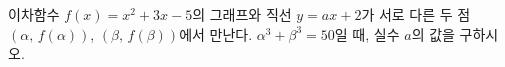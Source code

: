 이차함수 $f(x)=x^2+3x-5$의 그래프와 직선 $y=ax+2$가 서로 다른 두 점 $(\alpha,\,f(\alpha))$, $(\beta,\,f(\beta))$에서 만난다. $\alpha^3+\beta^3=50$일 때, 실수 $a$의 값을 구하시오.
